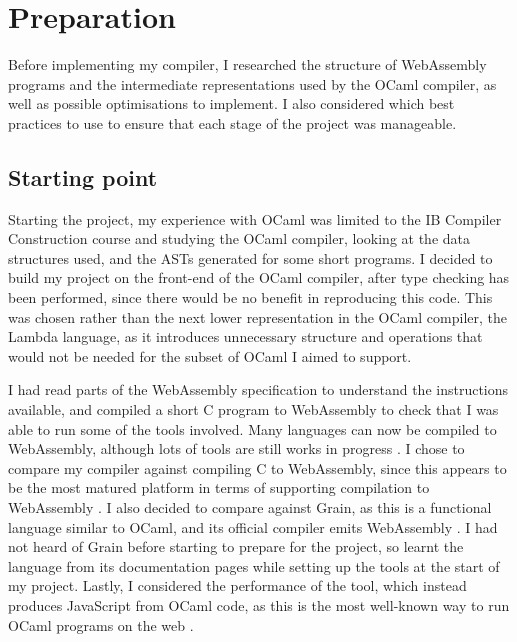 \chapter{Preparation} %


Before implementing my compiler, I researched the structure of WebAssembly programs and the intermediate representations used by the OCaml compiler, as well as possible optimisations to implement. I also considered which best practices to use to ensure that each stage of the project was manageable. %

\section{Starting point}
Starting the project, my experience with OCaml was limited to the IB Compiler Construction course and studying the OCaml compiler, looking at the data structures used, and the ASTs generated for some short programs. I decided to build my project on the front-end of the OCaml compiler, after type checking has been performed, since there would be no benefit in reproducing this code. This was chosen rather than the next lower representation in the OCaml compiler, the Lambda language, as it introduces unnecessary structure and operations that would not be needed for the subset of OCaml I aimed to support. 

I had read parts of the WebAssembly specification to understand the instructions available, and compiled a short C program to WebAssembly to check that I was able to run some of the tools involved.
Many languages can now be compiled to WebAssembly, although lots of tools are still works in progress \cite{langauges-to-wasm}. I chose to compare my compiler against compiling C to WebAssembly, since this appears to be the most matured platform in terms of supporting compilation to WebAssembly \cite{clang-llvm}. I also decided to compare against Grain, as this is a functional language similar to OCaml, and its official compiler emits WebAssembly \cite{grain}. I had not heard of Grain before starting to prepare for the project, so learnt the language from its documentation pages while setting up the tools at the start of my project. Lastly, I considered the performance of the \jsofocaml{} tool, which instead produces JavaScript from OCaml code, as this is the most well-known way to run OCaml programs on the web \cite{jsofocaml}.

